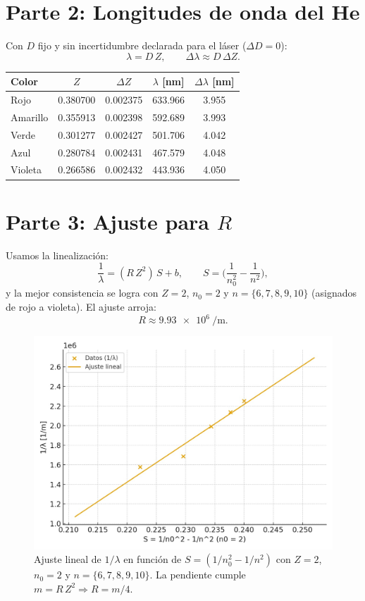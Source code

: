 \documentclass[11pt,a4paper]{article}
\begin{document}
\section*{Parte 2: Longitudes de onda del He}
Con \(D\) fijo y sin incertidumbre declarada para el láser (\(\Delta D=0\)):
\[
\lambda = D\,Z,\qquad \Delta\lambda \approx D\,\Delta Z.
\]
\begin{center}
\begin{tabular}{@{}lcccc@{}}
\toprule
Color & \(Z\) & \(\Delta Z\) & \(\lambda\) [nm] & \(\Delta\lambda\) [nm] \\
\midrule
Rojo     & \num{0,380700} & \num{0,002375} & \num{633,966} & \num{3,955} \\
Amarillo & \num{0,355913} & \num{0,002398} & \num{592,689} & \num{3,993} \\
Verde    & \num{0,301277} & \num{0,002427} & \num{501,706} & \num{4,042} \\
Azul     & \num{0,280784} & \num{0,002431} & \num{467,579} & \num{4,048} \\
Violeta  & \num{0,266586} & \num{0,002432} & \num{443,936} & \num{4,050} \\
\bottomrule
\end{tabular}
\end{center}

\section*{Parte 3: Ajuste para \(R\)}
Usamos la linealización:
\[
\frac{1}{\lambda} = (R\,Z^2)\,S + b,\qquad
S=\Big(\frac{1}{n_0^2}-\frac{1}{n^2}\Big),
\]
y la mejor consistencia se logra con \(Z=2\), \(n_0=2\) y \(n=\{6,7,8,9,10\}\) (asignados de rojo a violeta). El ajuste arroja:
\[
R \approx \SI{9,93e6}{\per\meter}.
\]
\begin{figure}[htbp]
  \centering
  \includegraphics[width=0.80\linewidth]{2d39423e-f3e0-42a1-b1c0-b04ef338b473.jpeg}
  \caption{Ajuste lineal de \(1/\lambda\) en función de \(S=(1/n_0^2-1/n^2)\) con \(Z=2\), \(n_0=2\) y \(n=\{6,7,8,9,10\}\).
  La pendiente cumple \(m=R\,Z^2\Rightarrow R=m/4\).}
  \label{fig:rydberg-refinado}
\end{figure}
\end{document}
